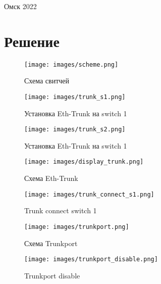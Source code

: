 \documentclass[14pt, a4paper]{article}
\begin{document}
    \vspace*{\fill}
    \begin{center}
        Омск 2022
    \end{center}

    \newpage

    \section*{Решение}

    \begin{figure}[H]
        \centering
        \texttt{[image: images/scheme.png]}
        \caption{Схема свитчей}
    \end{figure}

    \begin{figure}[H]
        \centering
        \texttt{[image: images/trunk\_s1.png]}
        \caption{Установка Eth-Trunk на switch 1}
    \end{figure}

    \begin{figure}[H]
        \centering
        \texttt{[image: images/trunk\_s2.png]}
        \caption{Установка Eth-Trunk на switch 1}
    \end{figure}

    \begin{figure}[H]
        \centering
        \texttt{[image: images/display\_trunk.png]}
        \caption{Схема Eth-Trunk}
    \end{figure}

    \begin{figure}[H]
        \centering
        \texttt{[image: images/trunk\_connect\_s1.png]}
        \caption{Trunk connect switch 1}
    \end{figure}

    \begin{figure}[H]
        \centering
        \texttt{[image: images/trunkport.png]}
        \caption{Схема Trunkport}
    \end{figure}

    \begin{figure}[H]
        \centering
        \texttt{[image: images/trunkport\_disable.png]}
        \caption{Trunkport disable}
    \end{figure}
\end{document}
